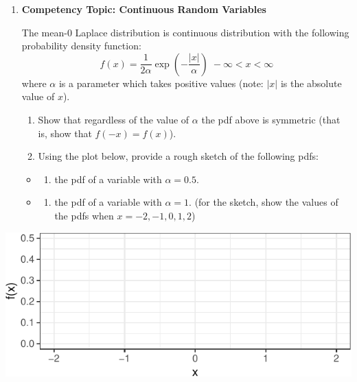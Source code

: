 \documentclass[11pt]{article}
\providecommand{\tightlist}{%
  \setlength{\itemsep}{0pt}\setlength{\parskip}{0pt}}
\begin{document}
\begin{enumerate}
\def\labelenumi{\arabic{enumi}.}
\setcounter{enumi}{1}
\item
  \textbf{Competency Topic: Continuous Random Variables}

  The mean-0 Laplace distribution is continuous distribution with the
  following probability density function:
  \[f(x) = \dfrac{1}{2\alpha} \exp\left(-\dfrac{|x|}{\alpha}\right) \; -\infty < x < \infty\]
  where \(\alpha\) is a parameter which takes positive values (note:
  \(|x|\) is the absolute value of \(x\)).

  \begin{enumerate}
  \def\labelenumii{\alph{enumii}.}
  \tightlist
  \item
    Show that regardless of the value of \(\alpha\) the pdf above is
    symmetric (that is, show that \(f(-x) = f(x)\)). \vspace{3cm}
  \item
    Using the plot below, provide a rough sketch of the following pdfs:
  \end{enumerate}

  \begin{itemize}
  \item
    \begin{enumerate}
    \def\labelenumii{(\arabic{enumii})}
    \tightlist
    \item
      the pdf of a variable with \(\alpha = 0.5\).
    \end{enumerate}
  \item
    \begin{enumerate}
    \def\labelenumii{(\arabic{enumii})}
    \setcounter{enumii}{1}
    \tightlist
    \item
      the pdf of a variable with \(\alpha = 1\). (for the sketch, show
      the values of the pdfs when \(x = -2, -1, 0, 1, 2\))
    \end{enumerate}
  \end{itemize}
\end{enumerate}

\begin{center}\includegraphics[width=.9\linewidth,height=.4\linewidth]{stat305-cq4_files/figure-latex/unnamed-chunk-2-1} \end{center}
\end{document}
